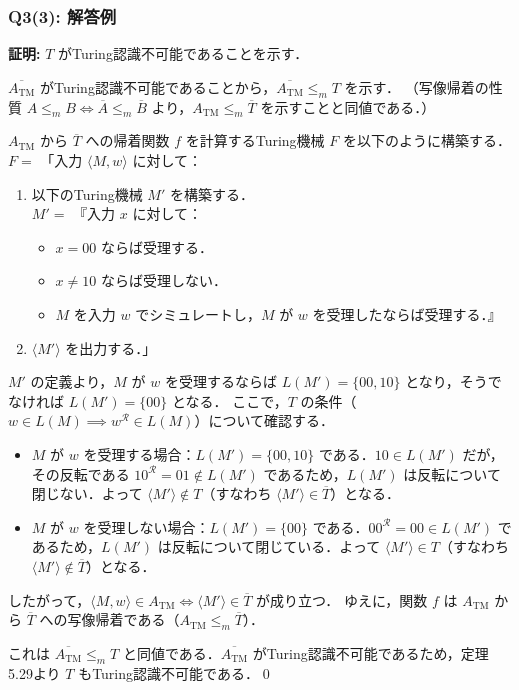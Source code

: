 \begin{frame}
\frametitle{Q3(3): 解答例}

\textbf{証明:} $T$ がTuring認識不可能であることを示す．

$\overline{A_{\mathrm{TM}}}$ がTuring認識不可能であることから，$\overline{A_{\mathrm{TM}}} \le_m T$ を示す．
（写像帰着の性質 $A \le_m B \iff \overline{A} \le_m \overline{B}$ より，$A_{\mathrm{TM}} \le_m \overline{T}$ を示すことと同値である．）

$A_{\mathrm{TM}}$ から $\overline{T}$ への帰着関数 $f$ を計算するTuring機械 $F$ を以下のように構築する．\\
$F=$ 「入力 $\langle M, w \rangle$ に対して：
\begin{enumerate}
    \item 以下のTuring機械 $M'$ を構築する． \\
     $M'=$ 『入力 $x$ に対して：
     \begin{itemize}
         \item $x = 00$ ならば受理する．
         \item $x \neq 10$ ならば受理しない．
         \item $M$ を入力 $w$ でシミュレートし，$M$ が $w$ を受理したならば受理する．』
     \end{itemize}
    \item $\langle M' \rangle$ を出力する．」
\end{enumerate}

\framebreak %

$M'$ の定義より，$M$ が $w$ を受理するならば $L(M') = \{00, 10\}$ となり，そうでなければ $L(M') = \{00\}$ となる．
ここで，$T$ の条件（$w \in L(M) \implies w^\mathcal{R} \in L(M)$）について確認する．

\begin{itemize}
    \item $M$ が $w$ を受理する場合：$L(M') = \{00, 10\}$ である．$10 \in L(M')$ だが，その反転である $10^\mathcal{R} = 01 \notin L(M')$ であるため，$L(M')$ は反転について閉じない．よって $\langle M' \rangle \notin T$（すなわち $\langle M' \rangle \in \overline{T}$）となる．
    \item $M$ が $w$ を受理しない場合：$L(M') = \{00\}$ である．$00^\mathcal{R} = 00 \in L(M')$ であるため，$L(M')$ は反転について閉じている．よって $\langle M' \rangle \in T$（すなわち $\langle M' \rangle \notin \overline{T}$）となる．
\end{itemize}

したがって，$\langle M, w \rangle \in A_{\mathrm{TM}} \iff \langle M' \rangle \in \overline{T}$ が成り立つ．
ゆえに，関数 $f$ は $A_{\mathrm{TM}}$ から $\overline{T}$ への写像帰着である（$A_{\mathrm{TM}} \le_m \overline{T}$）．

これは $\overline{A_{\mathrm{TM}}} \le_m T$ と同値である．$\overline{A_{\mathrm{TM}}}$ がTuring認識不可能であるため，定理5.29より $T$ もTuring認識不可能である．\qed
\end{frame}

